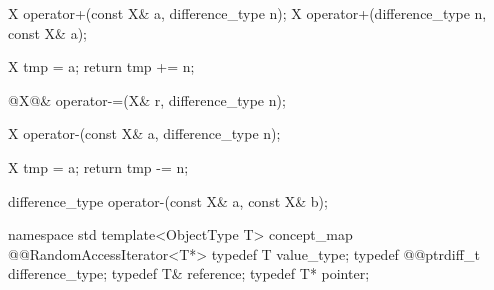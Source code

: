 \documentclass[american,twoside]{book}
\begin{document}
\begin{itemdecl}
X operator+(const X& a, difference_type n);
X operator+(difference_type n, const X& a);
\end{itemdecl}

\pnum
{}
\begin{codeblock}
{ X tmp = a;
return tmp += n; }
\end{codeblock}

\pnum
{}

\begin{itemdecl}
@\textcolor{addclr}{X}@& operator-=(X& r, difference_type n);
\end{itemdecl}

\pnum
{}

\begin{itemdecl}
X operator-(const X& a, difference_type n);
\end{itemdecl}

\pnum
{}
\begin{codeblock}
{ X tmp = a;
  return tmp -= n; }
\end{codeblock}

\begin{itemdecl}
difference_type operator-(const X& a, const X& b);
\end{itemdecl}

\pnum
{}

\pnum
{}

\pnum
{}

\pnum
{} 

\begin{codeblock}
namespace std {
  template<ObjectType T> concept_map @@RandomAccessIterator<T*> {
    typedef T value_type;
    typedef @@ptrdiff_t difference_type;
    typedef T& reference;
    typedef T* pointer;
  }
}
\end{codeblock}

\end{document}
